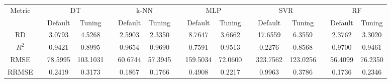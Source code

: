 \begin{table}[!htbp]
	\setlength{\tabcolsep}{3pt}
	\begin{tabular}{cccccccccccccccc}
		\toprule
		\multirow{2}{*}{Metric} & & \multicolumn{2}{c}{DT} & & \multicolumn{2}{c}{k-NN} & & \multicolumn{2}{c}{MLP} & & \multicolumn{2}{c}{SVR} & & \multicolumn{2}{c}{RF}\\
		 \cline{3-4} \cline{6-7} \cline{9-10} \cline{12-13} \cline{15-16}
		  & & Default & Tuning & & Default & Tuning & & Default & Tuning & & Default & Tuning & & Default & Tuning\\
		\midrule
		RD & & 3.0793 & 4.5268 & & 2.5903 & 2.3350 & & 8.7647 & 3.6662 & & 17.6559 & 6.3559 & & 2.3762 & 3.3020\\
		$R^2$ & & 0.9421 & 0.8995 & & 0.9654 & 0.9690 & & 0.7591 & 0.9513 & & 0.2276 & 0.8568 & & 0.9700 & 0.9461\\
		RMSE & & 78.5995 & 103.1031 & & 60.6744 & 57.3945 & & 159.5034 & 72.0600 & & 323.7562 & 123.0256 & & 56.4099 & 76.2350\\
		RRMSE & & 0.2419 & 0.3173 & & 0.1867 & 0.1766 & & 0.4908 & 0.2217 & & 0.9963 & 0.3786 & & 0.1736 & 0.2346\\
		\bottomrule
	\end{tabular}
\end{table}
